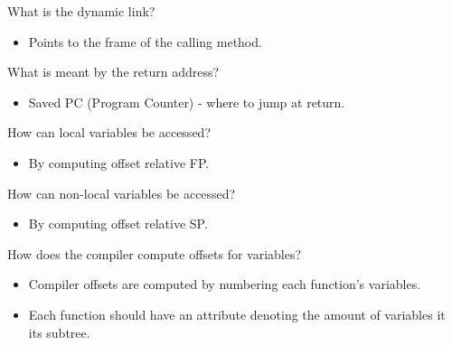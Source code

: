 \documentclass[11pt]{beamer}
\begin{document}
\begin{frame}
\begin{block}{What is the dynamic link? }
\begin{itemize}
\item Points to the frame of the calling method.
\end{itemize}
\end{block}

\begin{block}{What is meant by the return address?  }
\begin{itemize}
\item Saved PC (Program Counter) - where to jump at return.
\end{itemize}
\end{block}


\begin{block}{How can local variables be accessed? }
\begin{itemize}
\item By computing offset relative FP.
\end{itemize}
\end{block}

\begin{block}{How can non-local variables be accessed?  }
\begin{itemize}
\item By computing offset relative SP.
\end{itemize}
\end{block}

\begin{block}{How does the compiler compute offsets for variables? }
\begin{itemize}
\item Compiler offsets are computed by numbering each function's variables.
\item Each function should have an attribute denoting the amount of variables it its subtree.
\end{itemize}
\end{block}
\end{frame}
\end{document}

